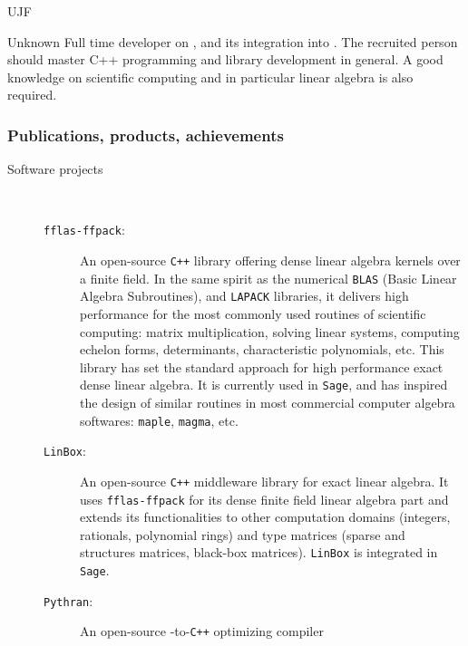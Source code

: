 \begin{sitedescription}{UJF}
\begin{participant}[type=res,PM=24,salary=4200,gender=]{Unknown}
Full time developer on \Linbox, and its integration into \Sage. The recruited
person should master C++ programming and library development in general. A good
knowledge on scientific computing and in particular linear algebra is also required. 
\end{participant}

\subsubsection*{Publications, products, achievements}

\begin{description}
\item[Software projects]\
  \begin{description}
 \item[\texttt{fflas-ffpack}:] An open-source \texttt{C++} library offering dense
    linear algebra kernels over a finite field. In the same  spirit as the
    numerical \texttt{BLAS} (Basic Linear Algebra Subroutines), and
    \texttt{LAPACK} libraries, it delivers high performance for the most
    commonly used routines of scientific computing: matrix multiplication,
    solving linear systems, computing echelon forms, determinants,
    characteristic polynomials, etc. This library has set the standard
    approach for high performance exact dense linear algebra. It is currently
    used in \texttt{Sage}, and has inspired the design of similar routines in
    most commercial computer algebra softwares: \texttt{maple}, \texttt{magma}, etc.
  \item[\texttt{LinBox}:] An open-source \texttt{C++} middleware library for
    exact linear algebra. It uses \texttt{fflas-ffpack} for its dense finite
    field linear algebra part and extends its functionalities to other
    computation domains (integers, rationals, polynomial rings) and type
    matrices (sparse and structures matrices, black-box
    matrices). \texttt{LinBox} is integrated in \texttt{Sage}. 
  \item[\texttt{Pythran}:] \label{pythran-descr}An open-source \Python-to-\texttt{C++} optimizing compiler

\end{description}
\end{description}
\end{sitedescription}
